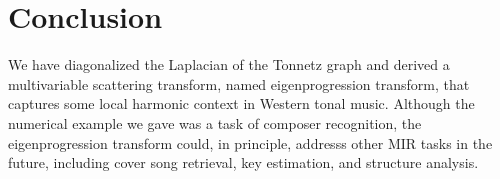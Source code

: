 \documentclass{article}
\begin{document}
\section{Conclusion}
We have diagonalized the Laplacian of the Tonnetz graph and derived a multivariable scattering transform, named eigenprogression transform, that captures some local harmonic context in Western tonal music.
Although the numerical example we gave was a task of composer recognition, the eigenprogression transform could, in principle, addresss other MIR tasks in the future, including cover song retrieval, key estimation, and structure analysis.

\newpage


%
%
%
%
\end{document}
